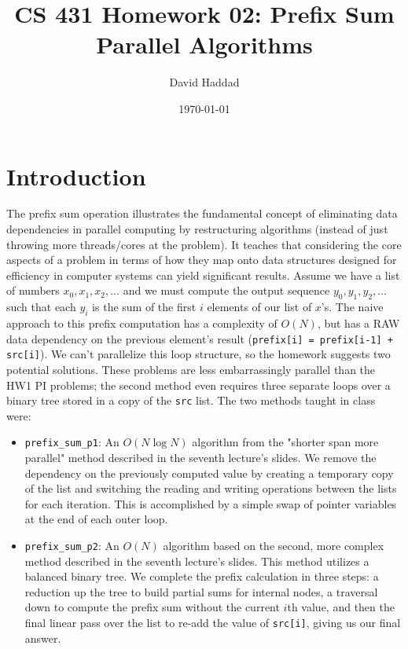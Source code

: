 \documentclass[11pt, letterpaper]{article}
\title{CS 431 Homework 02: Prefix Sum Parallel Algorithms}
\author{David Haddad}
\date{\today}
\begin{document}
\maketitle

\section{Introduction}
The prefix sum operation illustrates the fundamental concept of eliminating data dependencies in parallel computing by restructuring algorithms (instead of just throwing more threads/cores at the problem). It teaches that considering the core aspects of a problem in terms of how they map onto data structures designed for efficiency in computer systems can yield significant results. Assume we have a list of numbers $x_0, x_1, x_2, \ldots$ and we must compute the output sequence $y_0, y_1, y_2, \ldots$ such that each $y_i$ is the sum of the first $i$ elements of our list of $x$'s. The naive approach to this prefix computation has a complexity of $O(N)$, but has a RAW data dependency on the previous element's result (\texttt{prefix[i] = prefix[i-1] + src[i]}). We can't parallelize this loop structure, so the homework suggests two potential solutions. These problems are less embarrassingly parallel than the HW1 PI problems; the second method even requires three separate loops over a binary tree stored in a copy of the \texttt{src} list. The two methods taught in class were:

\begin{itemize}
    \item \texttt{prefix\_sum\_p1}: An $O(N\log{N})$ algorithm from the "shorter span more parallel" method described in the seventh lecture's slides. We remove the dependency on the previously computed value by creating a temporary copy of the list and switching the reading and writing operations between the lists for each iteration.
    This is accomplished by a simple swap of pointer variables at the end of each outer loop.

    \item \texttt{prefix\_sum\_p2}: An $O(N)$ algorithm based on the second, more complex method described in the seventh lecture's slides. This method utilizes a balanced binary tree. We complete the prefix calculation in three steps: a reduction up the tree to build partial sums for internal nodes, a traversal down to compute the prefix sum without the current $i$th value, and then the final linear pass over the list to re-add the value of \texttt{src[i]}, giving us our final answer.
\end{itemize}
\end{document}
